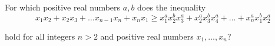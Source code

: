 For which positive real numbers $a,b$ does the inequality\[x_1x_2+x_2x_3+\ldots x_{n-1}x_n+x_nx_1\ge x_1^ax_2^bx_3^a+  x_2^ax_3^bx_4^a+\ldots +x_n^ax_1^bx_2^a\]

hold for all integers $n>2$ and positive real numbers $x_1,\ldots ,x_n$?